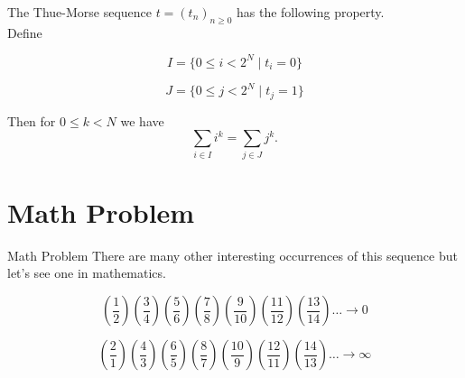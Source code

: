 \documentclass{beamer}
\begin{document}
\begin{frame}
    \begin{theorem}
        The Thue-Morse sequence \( t = (t_n)_{n \geq 0} \) has the following property.  \\
        Define  
        
        \[I = \{0 \leq i < 2^N \mid t_i = 0\}\]
        
        \[J = \{0 \leq j < 2^N \mid t_j = 1\}\]
        
        Then for \( 0 \leq k < N \) we have  
        \[\sum_{i \in I} i^k = \sum_{j \in J} j^k.\]
    \end{theorem}
    
\end{frame}

\section{Math Problem}

\begin{frame}{Math Problem}
    There are many other interesting occurrences of this sequence but let's see one in mathematics.

    \vspace{1cm}
    
    \[
    \left(\frac{1}{2}\right)\left(\frac{3}{4}\right)\left(\frac{5}{6}\right) \left(\frac{7}{8}\right)\left(\frac{9}{10}\right)\left(\frac{11}{12}\right)\left(\frac{13}{14}\right)\dots \to 0
    \]

    \[
    \left(\frac{2}{1}\right)\left(\frac{4}{3}\right)\left(\frac{6}{5}\right) \left(\frac{8}{7}\right)\left(\frac{10}{9}\right)\left(\frac{12}{11}\right)\left(\frac{14}{13}\right)\dots \to \infty
    \]

\end{frame}
\end{document}
